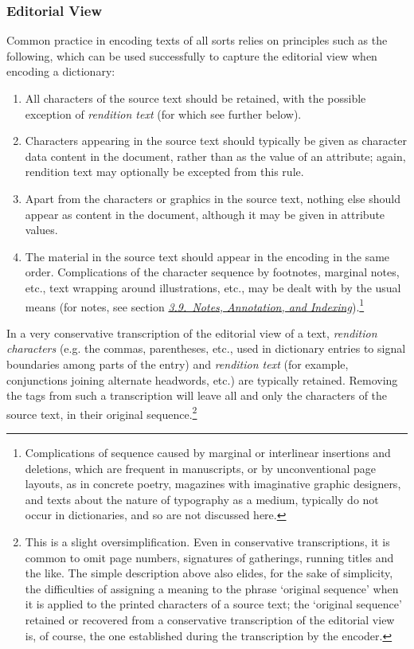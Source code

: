\subsubsection[{Editorial View}]{Editorial View}\label{DIMVTV}\par
Common practice in encoding texts of all sorts relies on principles such as the following, which can be used successfully to capture the editorial view when encoding a dictionary:\begin{enumerate}
\item All characters of the source text should be retained, with the possible exception of \textit{rendition text} (for which see further below).
\item Characters appearing in the source text should typically be given as character data content in the document, rather than as the value of an attribute; again, rendition text may optionally be excepted from this rule. 
\item Apart from the characters or graphics in the source text, nothing else should appear as content in the document, although it may be given in attribute values. 
\item The material in the source text should appear in the encoding in the same order. Complications of the character sequence by footnotes, marginal notes, etc., text wrapping around illustrations, etc., may be dealt with by the usual means (for notes, see section \textit{\hyperref[CONO]{3.9.\ Notes, Annotation, and Indexing}}).\footnote{Complications of sequence caused by marginal or interlinear insertions and deletions, which are frequent in manuscripts, or by unconventional page layouts, as in concrete poetry, magazines with imaginative graphic designers, and texts about the nature of typography as a medium, typically do not occur in dictionaries, and so are not discussed here.}
\end{enumerate}\par
In a very conservative transcription of the editorial view of a text, \textit{rendition characters} (e.g. the commas, parentheses, etc., used in dictionary entries to signal boundaries among parts of the entry) and \textit{rendition text} (for example, conjunctions joining alternate headwords, etc.) are typically retained. Removing the tags from such a transcription will leave all and only the characters of the source text, in their original sequence.\footnote{This is a slight oversimplification. Even in conservative transcriptions, it is common to omit page numbers, signatures of gatherings, running titles and the like. The simple description above also elides, for the sake of simplicity, the difficulties of assigning a meaning to the phrase ‘original sequence’ when it is applied to the printed characters of a source text; the ‘original sequence’ retained or recovered from a conservative transcription of the editorial view is, of course, the one established during the transcription by the encoder.}\par
